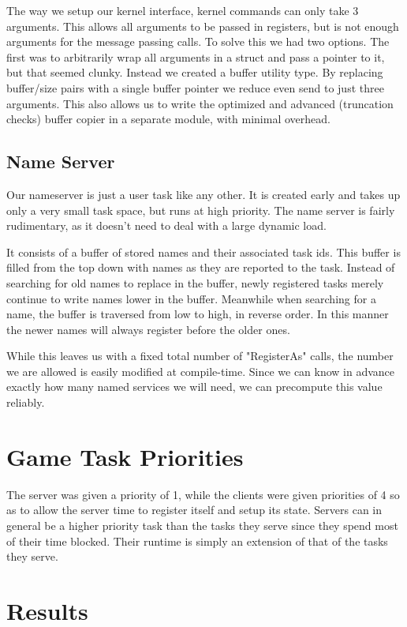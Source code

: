 \documentclass{article}
\begin{document}
The way we setup our kernel interface, kernel commands can only take 3
arguments. This allows all arguments to be passed in registers, but is not
enough arguments for the message passing calls. To solve this we had two
options. The first was to arbitrarily wrap all arguments in a struct and pass a
pointer to it, but that seemed clunky. Instead we created a buffer utility type.
By replacing buffer/size pairs with a single buffer pointer we reduce even send
to just three arguments. This also allows us to write the optimized and advanced
(truncation checks) buffer copier in a separate module, with minimal overhead.

\subsection*{Name Server}

Our nameserver is just a user task like any other. It is created early and takes
up only a very small task space, but runs at high priority. The name server is
fairly rudimentary, as it doesn't need to deal with a large dynamic load.

It consists of a buffer of stored names and their associated task ids. This
buffer is filled from the top down with names as they are reported to the task.
Instead of searching for old names to replace in the buffer, newly registered
tasks merely continue to write names lower in the buffer. Meanwhile when
searching for a name, the buffer is traversed from low to high, in reverse
order. In this manner the newer names will always register before the older
ones.

While this leaves us with a fixed total number of "RegisterAs" calls, the number
we are allowed is easily modified at compile-time. Since we can know in advance
exactly how many named services we will need, we can precompute this value
reliably.

\section*{Game Task Priorities}

The server was given a priority of 1, while the clients were given priorities of
4 so as to allow the server time to register itself and setup its state. Servers
can in general be a higher priority task than the tasks they serve since they
spend most of their time blocked. Their runtime is simply an extension of that
of the tasks they serve.

\section*{Results}
\end{document}
